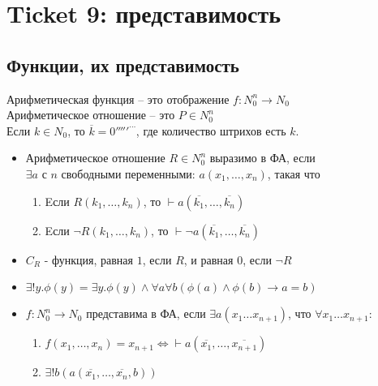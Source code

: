 \section{Ticket 9: представимость}
\label{sec-11}
\subsection{Функции, их представимость}
\label{sec-11-1}
Арифметическая функция -- это отображение $f: N_0^n \to N_0$ \\
Арифметическое отношение -- это $P \in N_0^n$ \\
Если $k \in N_0$, то $\overline k = 0'''''^\cdots$, где количество штрихов есть $k$.
\begin{itemize}
\item Арифметическое отношение $R \in N_0^n$ выразимо в ФА, если\\
$\exists a$ с $n$ свободными переменными:
$a(x_1,\dotsc, x_n)$, такая что
\begin{enumerate}
\item Eсли $R(k_1,\dotsc, k_n)$, то $\vdash a(\overline{k_1}, \dotsc, \overline{k_n})$
\item Eсли $\lnot R(k_1, \dotsc, k_n)$, то $\vdash \lnot a(\overline{k_1}, \dotsc, \overline{k_n})$
\end{enumerate}
\item $C_R$ - функция, равная $1$, если $R$, и равная $0$, если $\lnot R$
\item $\exists !y.\phi(y) = \exists y.\phi(y) \land \forall a\forall b(\phi(a) \land \phi(b) \to a = b)$
\item $f: N_0^n \to N_0$ представима в ФА, если $\exists a(x_1\dots x_{n+1})$, что
$\forall x_1\dotsc x_{n+1}:$
\begin{enumerate}
\item $f(x_1, \dotsc, x_n) = x_{n+1} \Leftrightarrow \vdash a(\overline{x_1}, \dotsc, \overline{x_{n+1}})$
\item $\exists !b(a(\overline{x_1}, \dotsc, \overline{x_n}, b))$
\end{enumerate}
\end{itemize}
